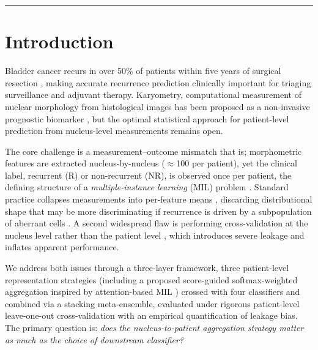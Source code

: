 \documentclass[12pt, onecolumn]{article}
\begin{document}
\vspace{0.8em}
\noindent\rule{\textwidth}{0.4pt}

\newpage
\thispagestyle{plain}
{
\hypersetup{linkcolor=navyblue}
\tableofcontents
}

\newpage
\setcounter{page}{1}
\pagestyle{plain}


\section{Introduction}
 
Bladder cancer recurs in over 50\% of patients within five years of surgical resection \citep{korde2009}, making accurate recurrence prediction clinically important for triaging surveillance and adjuvant therapy. Karyometry, computational measurement of nuclear morphology from histological images has been proposed as a non-invasive prognostic biomarker \citep{korde2009}, but the optimal statistical approach for patient-level prediction from nucleus-level measurements remains open.
 
The core challenge is a measurement--outcome mismatch that is; morphometric features are extracted nucleus-by-nucleus ($\approx$100 per patient), yet the clinical label, recurrent (R) or non-recurrent (NR), is observed once per patient, the defining structure of a \emph{multiple-instance learning} (MIL) problem \citep{dietterich1997}. Standard practice collapses measurements into per-feature means \citep{korde2009}, discarding distributional shape that may be more discriminating if recurrence is driven by a subpopulation of aberrant cells \citep{nowell1976}. A second widespread flaw is performing cross-validation at the nucleus level rather than the patient level \citep{campanella2019}, which introduces severe leakage and inflates apparent performance.
 
We address both issues through a three-layer framework, three patient-level representation strategies (including a proposed score-guided softmax-weighted aggregation inspired by attention-based MIL \citep{ilse2018}) crossed with four classifiers and combined via a stacking meta-ensemble, evaluated under rigorous patient-level leave-one-out cross-validation with an empirical quantification of leakage bias. The primary question is: \emph{does the nucleus-to-patient aggregation strategy matter as much as the choice of downstream classifier?}
\end{document}
